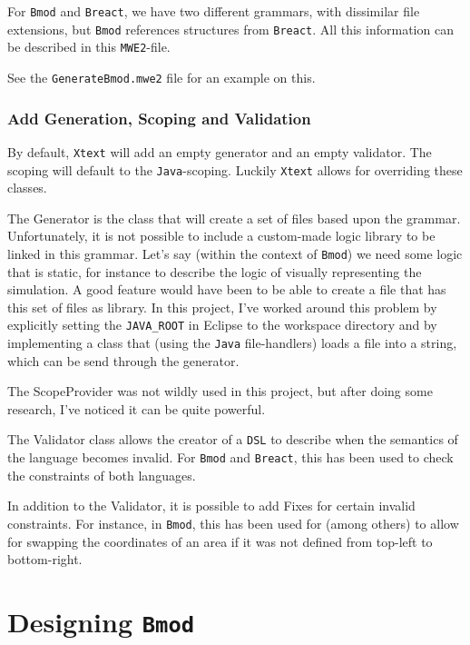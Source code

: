 \documentclass[review]{elsarticle}
\begin{document}
For \texttt{Bmod} and \texttt{Breact}, we have two different grammars, with dissimilar file extensions, but \texttt{Bmod} references structures from \texttt{Breact}. All this information can be described in this \texttt{MWE2}-file.

See the \texttt{GenerateBmod.mwe2} file for an example on this.

\subsubsection{Add Generation, Scoping and Validation}
By default, \texttt{Xtext} will add an empty generator and an empty validator. The scoping will default to the \texttt{Java}-scoping. Luckily \texttt{Xtext} allows for overriding these classes.

The \textsf{Generator} is the class that will create a set of files based upon the grammar. Unfortunately, it is not possible to include a custom-made logic library to be linked in this grammar. Let's say (within the context of \texttt{Bmod}) we need some logic that is static, for instance to describe the logic of visually representing the simulation. A good feature would have been to be able to create a file that has this set of files as library. In this project, I've worked around this problem by explicitly setting the \texttt{JAVA\_ROOT} in \textsf{Eclipse} to the workspace directory and by implementing a class that (using the \texttt{Java} file-handlers) loads a file into a string, which can be send through the generator.

The \textsf{ScopeProvider} was not wildly used in this project, but after doing some research, I've noticed it can be quite powerful.

The \textsf{Validator} class allows the creator of a \texttt{DSL} to describe when the semantics of the language becomes invalid. For \texttt{Bmod} and \texttt{Breact}, this has been used to check the constraints of both languages.

In addition to the \textsf{Validator}, it is possible to add \textsf{Fixes} for certain invalid constraints. For instance, in \texttt{Bmod}, this has been used for (among others) to allow for swapping the coordinates of an area if it was not defined from top-left to bottom-right.




\section{Designing \texttt{Bmod}}
\label{sec:bmod}
\end{document}
